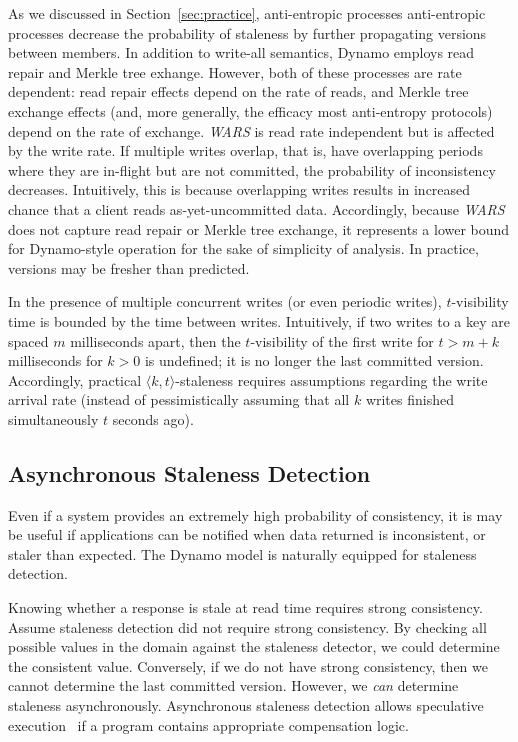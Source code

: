 \documentclass{vldb}
\begin{document}
As we discussed in Section~\ref{sec:practice}, anti-entropic processes
anti-entropic processes decrease the probability of staleness by
further propagating versions between members.  In addition to
write-all semantics, Dynamo employs read repair and Merkle tree
exhange. However, both of these processes are rate dependent: read
repair effects depend on the rate of reads, and Merkle tree exchange effects
(and, more generally, the efficacy most anti-entropy protocols) depend on
the rate of exchange.  \textit{WARS} is read rate independent but is
affected by the write rate.  If multiple writes overlap, that is, have
overlapping periods where they are in-flight but are not committed,
the probability of inconsistency decreases.  Intuitively, this is
because overlapping writes results in increased chance that a
client reads as-yet-uncommitted data.  Accordingly, because \textit{WARS} does
not capture read repair or Merkle tree exchange, it
represents a lower bound for Dynamo-style operation for the sake of
simplicity of analysis.  In practice, versions may be fresher than predicted.

In the presence of multiple concurrent writes (or even periodic
writes), $t$-visibility time is bounded by the time between writes.
Intuitively, if two writes to a key are spaced $m$ milliseconds apart,
then the $t$-visibility of the first write for $t > m+k$ milliseconds
for $k >0$ is undefined; it is no longer the last committed version.
Accordingly, practical $\langle k, t \rangle$-staleness requires
assumptions regarding the write arrival rate (instead of
pessimistically assuming that all $k$ writes finished simultaneously
$t$ seconds ago).

\subsection{Asynchronous Staleness Detection}

Even if a system provides an extremely high probability of
consistency, it is may be useful if applications can be notified when
data returned is inconsistent, or staler than expected.  The Dynamo
model is naturally equipped for staleness detection.

Knowing whether a response is stale at read time requires strong
consistency.  Assume staleness detection did not require strong
consistency.  By checking all possible values in the domain against
the staleness detector, we could determine the consistent value.
Conversely, if we do not have strong consistency, then we cannot
determine the last committed version. However, we \textit{can}
determine staleness asynchronously.  Asynchronous staleness detection
allows speculative execution~\cite{nsdispeculation} if a program
contains appropriate compensation logic.
\end{document}
